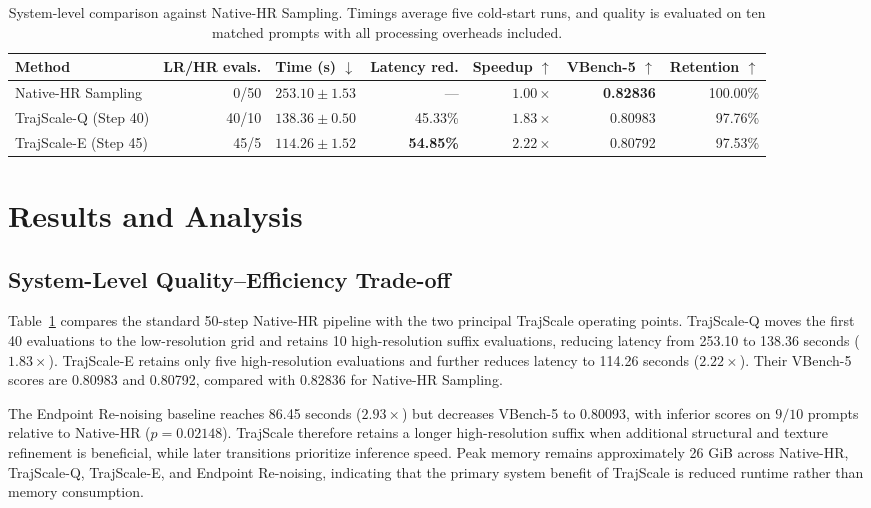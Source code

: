 \begin{table}[!t]
\centering
\footnotesize
\setlength{\tabcolsep}{5pt}
\begin{tabular}{lrrrrrr}
\toprule
Method & LR/HR evals. & Time (s) $\downarrow$ & Latency red. &
Speedup $\uparrow$ & VBench-5 $\uparrow$ & Retention $\uparrow$ \\
\midrule
Native-HR Sampling & 0/50 & $253.10\pm1.53$ & --- &
$1.00\times$ & \textbf{0.82836} & 100.00\% \\
TrajScale-Q (Step 40) & 40/10 & $138.36\pm0.50$ & 45.33\% &
$1.83\times$ & 0.80983 & 97.76\% \\
TrajScale-E (Step 45) & 45/5 & $\mathbf{114.26\pm1.52}$ &
\textbf{54.85\%} & $\mathbf{2.22\times}$ & 0.80792 & 97.53\% \\
\bottomrule
\end{tabular}
\caption{System-level comparison against Native-HR Sampling. Timings
average five cold-start runs, and quality is evaluated on ten matched
prompts with all processing overheads included.}
\label{tab:system}
\end{table}

\section{Results and Analysis}

\subsection{System-Level Quality--Efficiency Trade-off}

Table~\ref{tab:system} compares the standard 50-step Native-HR pipeline
with the two principal TrajScale operating points. TrajScale-Q moves the first 40
evaluations to the low-resolution grid and retains 10 high-resolution
suffix evaluations, reducing latency from 253.10 to 138.36 seconds
(\(1.83\times\)). TrajScale-E retains only five high-resolution evaluations
and further reduces latency to 114.26 seconds (\(2.22\times\)).
Their VBench-5 scores are 0.80983 and 0.80792, compared with 0.82836 for
Native-HR Sampling.

The Endpoint Re-noising baseline reaches 86.45 seconds
(\(2.93\times\)) but decreases VBench-5 to 0.80093, with inferior
scores on \(9/10\) prompts relative to Native-HR
(\(p=0.02148\)). TrajScale therefore retains a longer high-resolution suffix
when additional structural and texture refinement is beneficial, while
later transitions prioritize inference speed. Peak memory remains
approximately 26 GiB across Native-HR, TrajScale-Q, TrajScale-E, and Endpoint
Re-noising, indicating that the primary system benefit of TrajScale is reduced
runtime rather than memory consumption.


